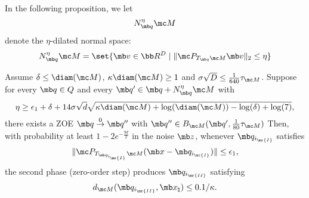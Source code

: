 \noindent In the following proposition, we let 
\begin{equation}
    N^\eta_{\mb q} \mc M 
\end{equation}
denote the $\eta$-dilated normal space: 
\begin{equation}
    N^{\eta}_{\mb q} \mc M = \set{ \mb v \in \bb R^D \mid \| \mc P_{T_{\mb q}\mc M} \mb v \|_2 \le \eta }
\end{equation}


\begin{proposition} \label{prop:phase II prop}
Assume $\delta \leq \diam(\mc M)$, $\kappa \diam(\mc M)\geq 1$ and $\sigma\sqrt{D} \leq \frac{1}{640} \tau_{\mc M}$. Suppose for every $\mb q \in Q$ and every $\mb q' \in \mb q + N^{\eta}_{\mb q}\mc M$ with 
\begin{equation}  
\eta \geq  \epsilon_1 + \delta + 14\sigma\sqrt{d}\sqrt{\kappa\diam(\mc M)+\log(\diam(\mc M))-\log(\delta)+\log(7)},
\end{equation} 
there exists a ZOE $\mb q \overset{0}{\rightarrow} \mb q''$ with $\mb q'' \in  B_{\mc M}( \mb q', \frac{1}{80}\tau_{\mc M} )$ Then, with probability at least {$1- 2e^{-\frac{9d}{2}}$} in the noise $\mb z$, whenever $\mb q_{i_{\mr{I}}}$ satisfies 
    \begin{equation}
        \| \mc P_{T_{\mb q_{i_{\mr{I}}}}\mc M} (\mb x - \mb q_{i_{\mr{I}}} ) \| \le \epsilon_1, 
    \end{equation}
    the second phase (zero-order step) produces $\mb q_{i_{\mr{II}}}$ satisfying
    \begin{equation}
        d_{\mc M}(\mb q_{i_{\mr{II}}}, \mb x_\natural) \leq 0.1/\kappa.
    \end{equation}
\end{proposition}
